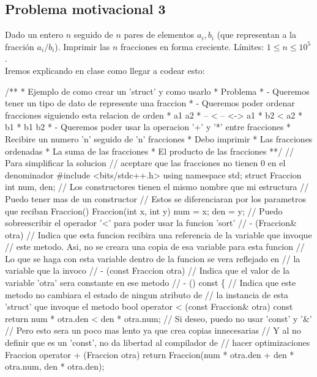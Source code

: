\documentclass[a4paper,11pt]{article}
\begin{document}
\subsection*{Problema motivacional 3}
Dado un entero $n$ seguido de $n$ pares de elementos $a_{i}, b_{i}$ (que representan a la fracción $a_{i}/b_{i}$). Imprimir las $n$ fracciones en forma creciente. Límites: $1 \leq n \leq 10^{5}$.\\[20pt]
Iremos explicando en clase como llegar a codear esto:
\begin{pyglist}[language=c++,caption={Prueba},style=vs]
/**
 * Ejemplo de como crear un 'struct' y como usarlo
 * Problema
 * - Queremos tener un tipo de dato de represente una fraccion
 * - Queremos poder ordenar fracciones siguiendo esta relacion de orden
 *      a1   a2
 *      -- < --      <->     a1 * b2 < a2 * b1
 *      b1   b2
 * - Queremos poder usar la operacion '+' y '*' entre fracciones
 * Recibire un numero 'n' seguido de 'n' fracciones
 * Debo imprimir
 * Las fracciones ordenadas
 * La suma de las fracciones
 * El producto de las fracciones
 **/
// Para simplificar la solucion
// aceptare que las fracciones no tienen 0 en el denominador
#include <bits/stdc++.h>
using namespace std;
struct Fraccion {
    int num, den;
    // Los constructores tienen el mismo nombre que mi estructura
    // Puedo tener mas de un constructor
    // Estos se diferenciaran por los parametros que reciban
    Fraccion() {}
    Fraccion(int x, int y) {
        num = x;
        den = y;
    }
    // Puedo sobreescribir el operador '<' para poder usar la funcion 'sort'
    // - (Fraccion\& otra)
    //   Indica que esta funcion recibira una referencia de la variable que invoque
    //   este metodo. Asi, no se creara una copia de esa variable para esta funcion
    //   Lo que se haga con esta variable dentro de la funcion se vera reflejado en
    //   la variable que la invoco
    // - (const Fraccion otra)
    //   Indica que el valor de la variable 'otra' sera constante en ese metodo
    // - () const \{
    //   Indica que este metodo no cambiara el estado de ningun atributo de
    //   la instancia de esta 'struct' que invoque el metodo
    bool operator < (const Fraccion& otra) const {
        return num * otra.den < den * otra.num;
    }
    // Si deseo, puedo no usar 'const' y '\&'
    // Pero esto sera un poco mas lento ya que crea copias innecesarias
    // Y al no definir que es un 'const', no da libertad al compilador de
    // hacer optimizaciones
    Fraccion operator + (Fraccion otra) {
        return Fraccion(num * otra.den + den * otra.num, den * otra.den);
}}
\end{pyglist}
\end{document}

